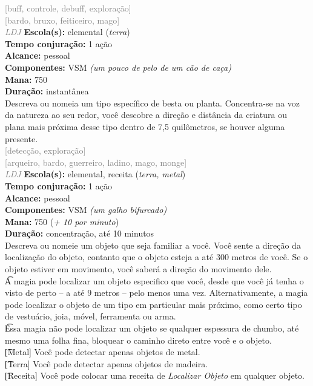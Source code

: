 \documentclass{RPG_Adventure}[2021/10/20]
\begin{document}
{\scriptsize \textcolor{gray}{[buff, controle, debuff, exploração]\\}}
{\scriptsize \textcolor{gray}{[bardo, bruxo, feiticeiro, mago]\\}}
{\tiny \textcolor{gray}{\textit{LDJ}}}
{\small \t \textbf{Escola(s):} elemental (\textit{terra})\\\t \textbf{Tempo conjuração:} 1 ação\\\t \textbf{Alcance:} pessoal\\\t \textbf{Componentes:} VSM \textit{(um pouco de pelo de um cão de caça)}\\\t \textbf{Mana:} 750\\\t \textbf{Duração:} instantânea\\}
{\normalsize Descreva ou nomeia um tipo específico de besta ou planta. Concentra-se na voz da natureza ao seu redor, você descobre a direção e distância da criatura ou plana mais próxima desse tipo dentro de 7,5 quilômetros, se houver alguma presente.\\}
{\scriptsize \textcolor{gray}{[detecção, exploração]\\}}
{\scriptsize \textcolor{gray}{[arqueiro, bardo, guerreiro, ladino, mago, monge]\\}}
{\tiny \textcolor{gray}{\textit{LDJ}}}
{\small \t \textbf{Escola(s):} elemental, receita (\textit{terra, metal})\\\t \textbf{Tempo conjuração:} 1 ação\\\t \textbf{Alcance:} pessoal\\\t \textbf{Componentes:} VSM \textit{(um galho bifurcado)}\\\t \textbf{Mana:} 750 (\textit{+ 10 por minuto})\\\t \textbf{Duração:} concentração, até 10 minutos\\}
{\normalsize Descreva ou nomeie um objeto que seja familiar a você. Você sente a direção da localização do objeto, contanto que o objeto esteja a até 300 metros de você. Se o objeto estiver em movimento, você saberá a direção do movimento dele.\\\t A magia pode localizar um objeto especifico que você, desde que você já tenha o visto de perto – a até 9 metros – pelo menos uma vez. Alternativamente, a magia pode localizar o objeto de um tipo em particular mais próximo, como certo tipo de vestuário, joia, móvel, ferramenta ou arma.\\\t Essa magia não pode localizar um objeto se qualquer espessura de chumbo, até mesmo uma folha fina, bloquear o caminho direto entre você e o objeto.\\\t [Metal] Você pode detectar apenas objetos de metal.\\\t [Terra] Você pode detectar apenas objetos de madeira.\\\t [Receita] Você pode colocar uma receita de \textit{Localizar Objeto} em qualquer objeto.\\}
\end{document}
